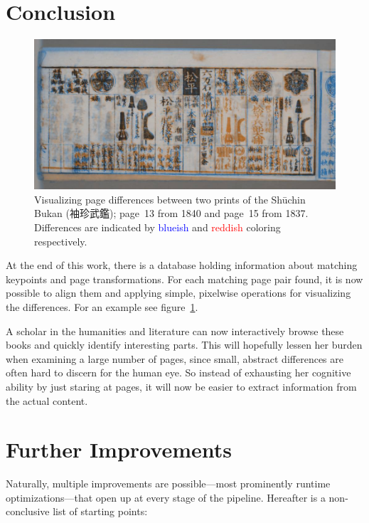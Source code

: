 \documentclass{ltjarticle}
\begin{document}
\section{Conclusion}

\begin{figure}
    \centering
    \includegraphics[width=\textwidth]{page-compare.jpg}
    \caption[Visualizing page differences]{Visualizing page differences between two prints of the Shūchin Bukan (袖珍武鑑); page~13 from 1840 and page~15 from 1837. Differences are indicated by \textcolor{blue}{blueish} and \textcolor{red}{reddish} coloring respectively.}
    \label{fig:page-compare}
\end{figure}

At the end of this work, there is a database holding information about matching keypoints and page transformations. For each matching page pair found, it is now possible to align them and applying simple, pixelwise operations for visualizing the differences. For an example see figure~\ref{fig:page-compare}.

A scholar in the humanities and literature can now interactively browse these books and quickly identify interesting parts. This will hopefully lessen her burden when examining a large number of pages, since small, abstract differences are often hard to discern for the human eye. So instead of exhausting her cognitive ability by just staring at pages, it will now be easier to extract information from the actual content.

\section{Further Improvements}

Naturally, multiple improvements are possible---most prominently runtime optimizations---that open up at every stage of the pipeline. Hereafter is a non-conclusive list of starting points:
\end{document}

